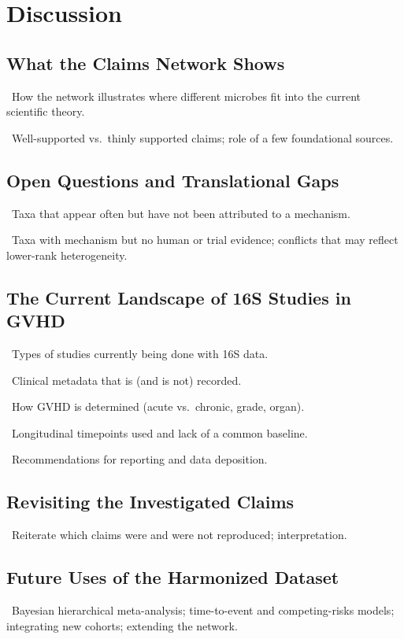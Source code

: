 \documentclass[11pt,a4paper]{article}
\newcommand{\todoitem}[1]{\par\noindent\textcolor{blue!70!black}{\textbullet~#1}}
\begin{document}
\section{Discussion}
\label{sec:discussion}

\subsection{What the Claims Network Shows}
\label{sec:disc-network}
\todoitem{How the network illustrates where different microbes fit into the current scientific theory.}
\todoitem{Well-supported vs.\ thinly supported claims; role of a few foundational sources.}

\subsection{Open Questions and Translational Gaps}
\label{sec:disc-gaps}
\todoitem{Taxa that appear often but have not been attributed to a mechanism.}
\todoitem{Taxa with mechanism but no human or trial evidence; conflicts that may reflect lower-rank heterogeneity.}

\subsection{The Current Landscape of 16S Studies in GVHD}
\label{sec:disc-landscape}
\todoitem{Types of studies currently being done with 16S data.}
\todoitem{Clinical metadata that is (and is not) recorded.}
\todoitem{How GVHD is determined (acute vs.\ chronic, grade, organ).}
\todoitem{Longitudinal timepoints used and lack of a common baseline.}
\todoitem{Recommendations for reporting and data deposition.}

\subsection{Revisiting the Investigated Claims}
\label{sec:disc-claims}
\todoitem{Reiterate which claims were and were not reproduced; interpretation.}

\subsection{Future Uses of the Harmonized Dataset}
\label{sec:disc-future}
\todoitem{Bayesian hierarchical meta-analysis; time-to-event and competing-risks models; integrating new cohorts; extending the network.}
\end{document}
